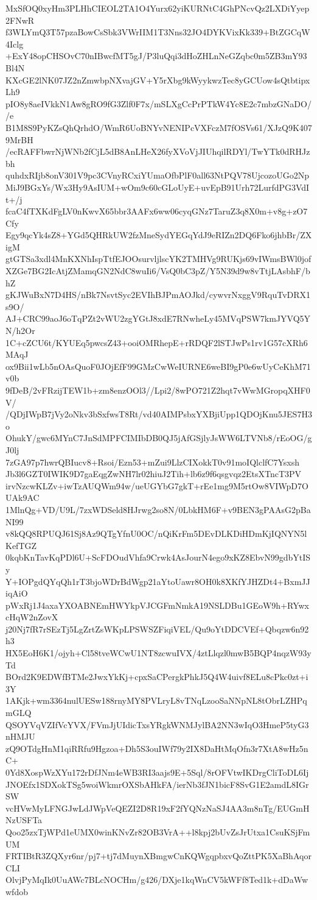 MxSfOQ0xyHm3PLHhCIEOL2TA1O4Yurx62yiKURNtC4GhPNcvQz2LXDiYyep2FNwR
f3WLYmQ3T57pzaBowCsSbk3VWrIIM1T3Nns32JO4DYKVixKk339+BtZGCqW4Iclg
+ExY48opCHSOvC70nIBwcfMT5gJ/P3luQqi3dHoZHLnNeGZqbc0m5ZB3mY93Bl4N
KXcGE2lNK07JZ2nZmwbpNXvajGV+Y5rXbg9kWyykwzTec8yGCUow4sQtbtipxLh9
pIO8y8aeIVkkN1Aw8gRO9fG3Zlf0F7x/mSLXgCcPrPTkW4Yc8E2c7mbzGNaDO//e
B1M8S9PyKZsQhQrhdO/WmR6UoBNYvNENIPcVXFczM7fOSVs61/XJzQ9K4079MrBH
/ecRAFFbwrNjWNb2fCjL5dB8AnLHeX26fyXVoVjJIUhqilRDYl/TwYTk0dRHJzbh
quhdxRIjb8onV301V9pc3CVnyRCxiYUmaOfbPlF0all63NtPQV78UjcozoUGo2Np
MiJ9BGxYs/Wx3Hy9AsIUM+wOm9c60cGLoUyE+uvEpB91Urh72LurfdPG3VdIt+/j
fcaC4fTXKdFgLV0nKwvX65bbr3AAFx6ww06cyqGNz7TaruZ3q8X0m+v8g+zO7Cfy
Egy9qcYk4sZ8+YGd5QHRkUW2fzMneSydYEGqYdJ9eRIZn2DQ6Fko6jhbBr/ZXigM
gtGTSa3xdl4MnKXNhIspTtfEJOOsurvljlscYK2TMHVg9RUKjs69vIWmsBWl0jof
XZGe7BG2IcAtjZMamqGN2NdC8wuIi6/VsQ0bC3pZ/Y5N39d9w8vTtjLAsbhF/bhZ
gKJWuBxN7D4HS/nBk7NsvtSyc2EVIhBJPmAOJkd/cywvrNxggV9RquTvDRX1s9O/
AJ+CRC99aoJ6oTqPZt2vWU2zgYGtJ8xdE7RNwheLy45MVqPSW7kmJYVQ5YN/h2Or
1C+cZCU6t/KYUEq5pwcsZ43+ooiOMRhepE+rRDQF2lSTJwPs1rv1G57cXRh6MAqJ
ox9Bii1wLb5nOAsQuoF0JOjEfF99GMzCwWeIURNE6weBI9gP0e6wUyCeKhM71v0b
9fDeB/2vFRzijTEW1b+zm8enzOOl3//Lpi2/8wPO721Z2hqt7vWwMGropqXHF0V/
/QDjIWpB7jVy2oNkv3bSxfwsT8Rt/vd40AIMPsbxYXBjiUpp1QDOjKnu5JES7H3o
OhukY/gwc6MYnC7JnSdMPFCIMIbDB0QJ5jAfGSjlyJsWW6LTVNb8/rEoOG/gJ0lj
7zGA97p7hwrQBIucv8+Rsoi/Ezn53+mZui9LlzCIXokkT0v91moIQlclfC7Ysxsh
Jb3l6GZT0IWIK9D7gaEqgZwNH7lr02hiuJ2Tih+lb6z9f6qsgvqz2EtsXTncT3PV
irvNzcwKLZv+iwTzAUQWm94w/ueUGYbG7gkT+rEe1mg9M5rtOw8VIWpD7OUAk9AC
1MlnQg+VD/U9L/7zxWDSeld8HJrwg2so8N/0LbkHM6F+v9BEN3gPAAsG2pBaNI99
v8kQQ8RPUQJ61Sj8Az9QTgYfnU0OC/nQiKrFm5DEvDLKDiHDmKjIQNYN5lKefTGZ
0kqbKnTavKqPDl6U+ScFDOudVhfa9Crwk4AsJourN4ego9xKZ8EbvN99gdbYtISy
Y+IOPgdQYqQh1rT3bjoWDrBdWgp21aYtoUawr8OH0k8XKfYJHZDt4+BxmJJiqAiO
pWxRj1J4axaYXOABNEmHWYkpVJCGFmNmkA19NSLDBu1GEoW9h+RYwxcHqW2nZovX
j20Nj7fR7rSEzTj5LgZrtZsWKpLPSWSZFiqiVEL/Qu9oYtDDCVEf+Qbqzw6n92h3
HX5EoH6K1/ojyh+Cl58tveWCwU1NT8zcwuIVX/4ztLlqzl0mwB5BQP4nqzW93yTd
BOrd2K9EDWfBTMe2JwxYkKj+cpxSaCPergkPhkJ5Q4W4uivf8ELu8cPkc0zt+i3Y
1AKjk+wm3364nulUESw188rnyMY8PVLryL8vTNqLzooSaNNpNL8tObrLZHPqmGLQ
QSOYVqVZIfVcYVX/FVmJjUIdicTxsYRgkWNMJylBA2NN3wIqO3HmeP5tyG3nHMJU
zQ9OTdgHnM1qiRRfu9Hgzoa+Dh5S3ouIWf79y2IX8DaHtMqOfn3r7XtA8wHz5nC+
0Yd8XospWzXYu172rDfJNm4eWB3RI3aajs9E+5Sql/8rOFVtwIKDrgCliToDL6Ij
JNOEfx1SDXokTSg5woiWkmrOXSbAHkFA/ierNb3fJN1bicF8SvG1E2amdL8IGrSW
vcHVwMyLFNGJwLdJWpVeQEZI2D8R19xF2fYQNzNaSJ4AA3m8nTg/EUGmHNzUSFTa
Qoo25zxTjWPd1eUMX0winKNvZr82OB3VrA++l8kpj2bUvZsJrUtxa1CsuKSjFmUM
FRTIBtR3ZQXyr6nr/pj7+tj7dMuynXBmgwCnKQWgqpbxvQoZttPK5XaBhAqorCLI
OlvjPyMqIk0UuAWc7BLcNOCHm/g426/DXje1kqWnCV5kWFf8Ted1k+dDaWwwfdob
